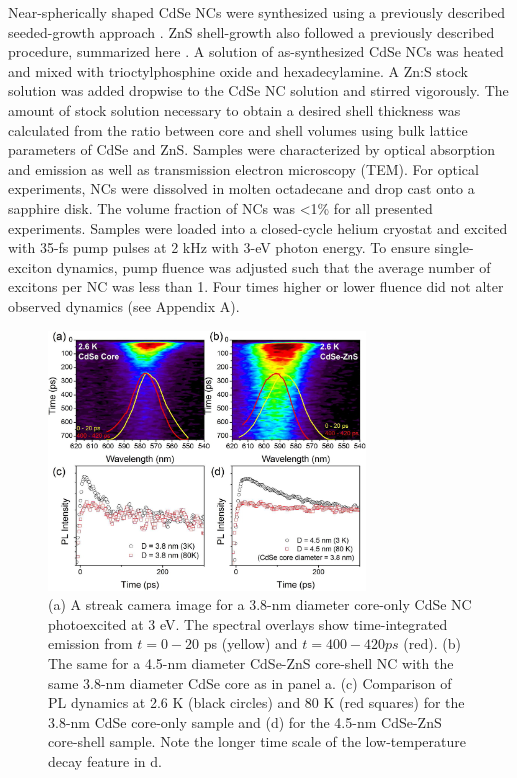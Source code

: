 Near-spherically shaped CdSe NCs were synthesized using a previously described seeded-growth approach \cite{doi:10.1021/nl0717661}.  ZnS shell-growth also followed a previously described procedure, summarized here \cite{doi:10.1021/nl0155126}. A solution of as-synthesized CdSe NCs was heated and mixed with trioctylphosphine oxide and hexadecylamine. A Zn:S stock solution was added dropwise to the CdSe NC solution and stirred vigorously. The amount of stock solution necessary to obtain a desired shell thickness was calculated from the ratio between core and shell volumes using bulk lattice parameters of CdSe and ZnS. Samples were characterized by optical absorption and emission as well as transmission electron microscopy (TEM). For optical experiments, NCs were dissolved in molten octadecane and drop cast onto a sapphire disk. The volume fraction of NCs was <1\% for all presented experiments. Samples were loaded into a closed-cycle helium cryostat and excited with 35-fs pump pulses at 2 kHz with 3-eV photon energy. To ensure single-exciton dynamics, pump fluence was adjusted such that the average number of excitons per NC was less than 1. Four times higher or lower fluence did not alter observed dynamics (see Appendix A). \par

\begin{figure}
\begin{center}
\includegraphics[width=0.75\textwidth]{./Chapter5/plevel2.jpeg}
\caption[Comparison of PL decay dynamics between core-only and core-shell CdSe NCs.]{(a) A streak camera image for a 3.8-nm diameter core-only CdSe NC photoexcited at 3 eV. The spectral overlays show time-integrated emission from $t = 0 - 20$ ps (yellow) and $t = 400 - 420 ps$ (red). (b) The same for a 4.5-nm diameter CdSe-ZnS core-shell NC with the same 3.8-nm diameter CdSe core as in panel a. (c) Comparison of PL dynamics at 2.6 K (black circles) and 80 K (red squares) for the 3.8-nm CdSe core-only sample and (d) for the 4.5-nm CdSe-ZnS core-shell sample. Note the longer time scale of the low-temperature decay feature in d.}
\label{f:plevel2}
\end{center}
\end{figure}

